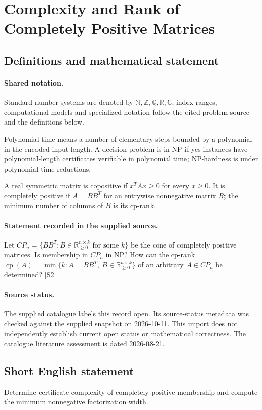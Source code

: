 \documentclass[11pt]{article}
\newcommand{\sref}[2]{\hyperlink{source:#1:#2}{[S#2]}}
\begin{document}
\section{Complexity and Rank of Completely Positive Matrices}\label{statement}

\subsection{Definitions and mathematical statement}

\paragraph{Shared notation.}Standard number systems are denoted by $\mathbb N,\mathbb Z,\mathbb Q,\mathbb R,\mathbb C$; index ranges, computational models and specialized notation follow the cited problem source and the definitions below.


Polynomial time means a number of elementary steps bounded by a polynomial in the encoded input length. A decision problem is in $\mathrm{NP}$ if yes-instances have polynomial-length certificates verifiable in polynomial time; NP-hardness is under polynomial-time reductions.

A real symmetric matrix is copositive if $x^TAx\geq0$ for every $x\geq0$. It is completely positive if $A=BB^T$ for an entrywise nonnegative matrix $B$; the minimum number of columns of $B$ is its cp-rank.
\paragraph{Statement recorded in the supplied source.}
Let $CP_n=\{BB^T:B\in\mathbb R_{\geq0}^{n\times k}\text{ for some }k\}$ be the cone of completely positive matrices. Is membership in $CP_n$ in NP? How can the cp-rank $\operatorname{cp}(A)=\min\{k:A=BB^T,\ B\in\mathbb R_{\geq0}^{n\times k}\}$ of an arbitrary $A\in CP_n$ be determined? \sref{statement}{2}
\paragraph{Source status.}
The supplied catalogue labels this record open. Its source-status metadata was checked against the supplied snapshot on 2026-10-11. This import does not independently establish current open status or mathematical correctness. The catalogue literature assessment is dated 2026-08-21.
\subsection{Short English statement}
Determine certificate complexity of completely-positive membership and compute the minimum nonnegative factorization width.
\end{document}
